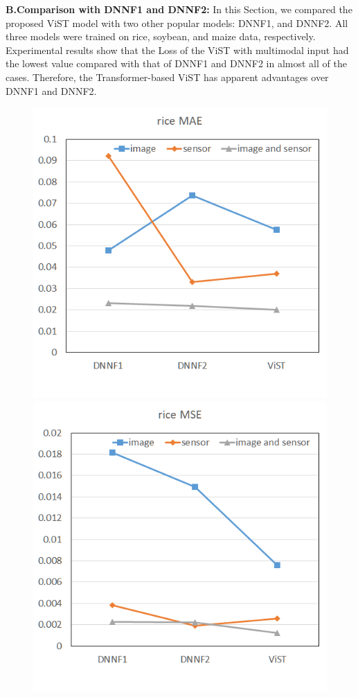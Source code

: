 \documentclass[acmsmall,manuscript, screen, review]{acmart}
\begin{document}
\textbf{B.Comparison with DNNF1 and DNNF2:}
In this Section, we compared the proposed ViST model with two other popular models: DNNF1, and DNNF2. All three models were trained on rice, soybean, and maize data, respectively. Experimental results show that the Loss of the ViST with multimodal input had the lowest value compared with that of DNNF1 and DNNF2 in almost all of the cases. Therefore, the Transformer-based ViST has apparent advantages over DNNF1 and DNNF2.
\begin{figure}[htbp]
  \centering
  \begin{minipage}{0.49\linewidth}
    \centering
    \includegraphics[width=\linewidth]{pic/comprehensive_rice_mae.png}
  \end{minipage}
  \centering
  \begin{minipage}{0.49\linewidth}
    \centering
    \includegraphics[width=\linewidth]{pic/comprehensive_rice_mse.png}

\end{minipage}
\end{figure}
\end{document}

